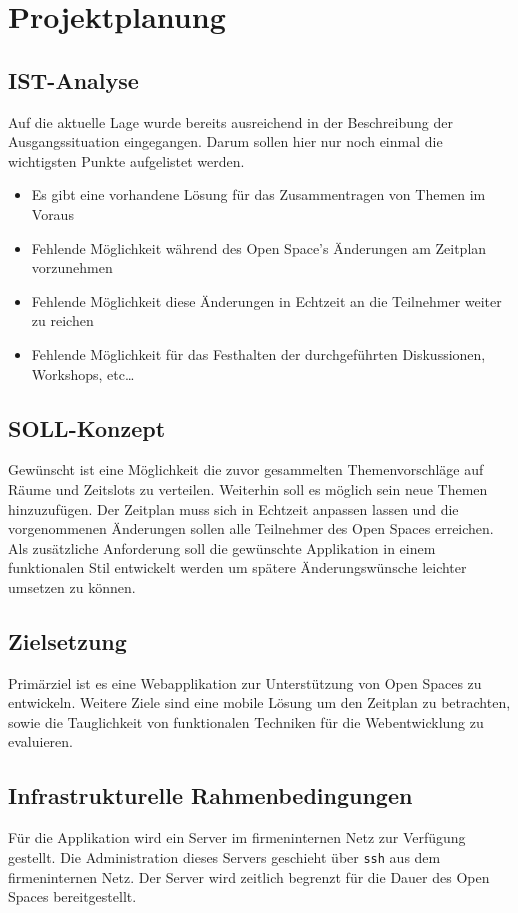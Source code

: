 \section{Projektplanung}
\subsection{IST-Analyse}
Auf die aktuelle Lage wurde bereits ausreichend in der Beschreibung
der Ausgangssituation eingegangen. Darum sollen hier nur noch einmal
die wichtigsten Punkte aufgelistet werden.
\begin{itemize}
\item Es gibt eine vorhandene Lösung für das Zusammentragen von Themen
  im Voraus
\item Fehlende Möglichkeit während des Open Space's Änderungen am
  Zeitplan vorzunehmen
\item Fehlende Möglichkeit diese Änderungen in Echtzeit an die
  Teilnehmer weiter zu reichen
\item Fehlende Möglichkeit für das Festhalten der durchgeführten
  Diskussionen, Workshops, etc\ldots
\end{itemize}
\subsection{SOLL-Konzept}
Gewünscht ist eine Möglichkeit die zuvor gesammelten Themenvorschläge
auf Räume und Zeitslots zu verteilen. Weiterhin soll es möglich sein
neue Themen hinzuzufügen. Der Zeitplan muss sich in Echtzeit anpassen
lassen und die vorgenommenen Änderungen sollen alle Teilnehmer des
Open Spaces erreichen. Als zusätzliche Anforderung soll die gewünschte
Applikation in einem funktionalen Stil entwickelt werden um spätere
Änderungswünsche leichter umsetzen zu können.
\subsection{Zielsetzung}
Primärziel ist es eine Webapplikation zur Unterstützung von Open
Spaces zu entwickeln. Weitere Ziele sind eine mobile Lösung um den
Zeitplan zu betrachten, sowie die Tauglichkeit von funktionalen
Techniken für die Webentwicklung zu evaluieren.
\subsection{Infrastrukturelle Rahmenbedingungen}
Für die Applikation wird ein Server im firmeninternen Netz zur
Verfügung gestellt. Die Administration dieses Servers geschieht über
\texttt{ssh} aus dem firmeninternen Netz. Der Server wird zeitlich
begrenzt für die Dauer des Open Spaces bereitgestellt.
